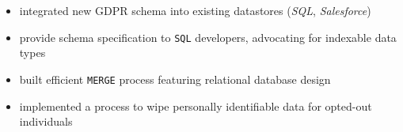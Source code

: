\documentclass[../cv.tex]{subfiles}
\begin{document}
\begin{description}[style=multiline,leftmargin=3cm]
\begin{description}[style=multiline,leftmargin=2cm]
	      \end{description}
	\item[GDPR Pipeline \textnormal{Technical Lead}]
	      \begin{itemize}
		      \item integrated new GDPR schema into existing datastores (\textit{SQL}, \textit{Salesforce})
		      \item provide schema specification to \texttt{SQL} developers, advocating for indexable data types
		      \item built efficient \texttt{MERGE} process featuring relational database design
		      \item implemented a process to wipe personally identifiable data for opted-out individuals
	      \end{itemize}
\end{description}
\end{document}
